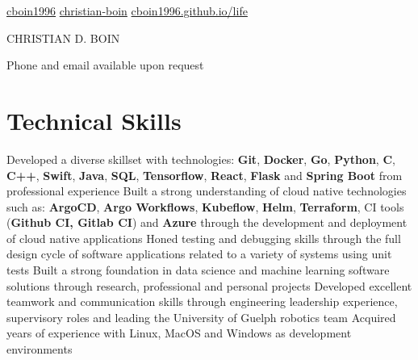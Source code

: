\documentclass[a4paper,11pt]{article}
\newcommand{\name}{CHRISTIAN D. BOIN} %
\newcommand{\github}{cboin1996} %
\newcommand{\linkedin}{christian-boin-masc-ai-6b705a135} %
\begin{document}
\selectfont


\newcommand{\iconspace}{0.4mm}
\newcommand{\headingsep}{1cm}
\begin{center}
	\small{\href{https://github.com/\github}{\faGithub \hspace{\iconspace} \github} \hspace{\headingsep}
		\href{https://www.linkedin.com/in/\linkedin/}{\faLinkedinSquare \hspace{\iconspace} christian-boin} \hspace{\headingsep}
		\href{https://cboin1996.github.io/life/}{\faFileCodeO \hspace{\iconspace} cboin1996.github.io/life}
	}
\end{center}
\begin{center}
	\vspace{-0.4cm}
	\huge{{\name}}
\end{center}
\begin{center}
	\vspace{-0.2cm}
	\tiny{
		Phone and email available upon request
	}
\end{center}
\section{Technical Skills}
\begin{entries}
	\ib Developed a diverse skillset with technologies: \textbf{Git}, \textbf{Docker}, \textbf{Go},
	\textbf{Python}, \textbf{C}, \textbf{C++}, \textbf{Swift}, \textbf{Java}, \textbf{SQL}, \textbf{Tensorflow}, \textbf{React},
	\textbf{Flask} and \textbf{Spring Boot} from professional experience
	\ib Built a strong understanding of cloud native technologies such as: \textbf{ArgoCD}, \textbf{Argo Workflows},
	\textbf{Kubeflow}, \textbf{Helm},
	\textbf{Terraform}, CI tools (\textbf{Github CI, Gitlab CI}) and \textbf{Azure} through the development and deployment
	of cloud native applications
	\ib Honed testing and debugging skills through the full design cycle of software applications related
	to a variety of systems using unit tests
	\ib Built a strong foundation in data science and machine learning software solutions through
	research, professional and personal projects
	\ib Developed excellent teamwork and communication skills through engineering leadership experience,
	supervisory roles and leading the University of Guelph robotics team
	\ib Acquired years of experience with Linux, MacOS and Windows as development environments
\end{entries}
\end{document}
